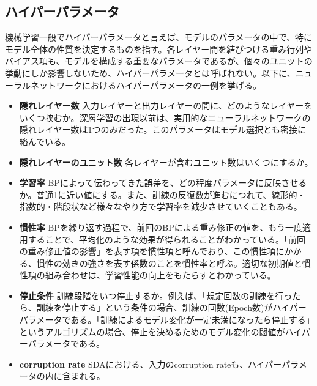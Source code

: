 \subsection{ハイパーパラメータ}
機械学習一般でハイパーパラメータと言えば、モデルのパラメータの中で、特にモデル全体の性質を決定するものを指す。各レイヤー間を結びつける重み行列やバイアス項も、モデルを構成する重要なパラメータであるが、個々のユニットの挙動にしか影響しないため、ハイパーパラメータとは呼ばれない。以下に、ニューラルネットワークにおけるハイパーパラメータの一例を挙げる。
\begin{itemize}
\item \textbf{隠れレイヤー数} 入力レイヤーと出力レイヤーの間に、どのようなレイヤーをいくつ挟むか。深層学習の出現以前は、実用的なニューラルネットワークの隠れレイヤー数は1つのみだった。このパラメータはモデル選択とも密接に絡んでいる。
\item \textbf{隠れレイヤーのユニット数} 各レイヤーが含むユニット数はいくつにするか。
\item \textbf{学習率} BPによって伝わってきた誤差を、どの程度パラメータに反映させるか。普通1に近い値にする。また、訓練の反復数が進むにつれて、線形的・指数的・階段状など様々なやり方で学習率を減少させていくこともある。
\item \textbf{慣性率} BPを繰り返す過程で、前回のBPによる重み修正の値を、もう一度適用することで、平均化のような効果が得られることがわかっている。「前回の重み修正値の影響」を表す項を慣性項と呼んでおり、この慣性項にかかる、慣性の効きの強さを表す係数のことを慣性率と呼ぶ。適切な初期値と慣性項の組み合わせは、学習性能の向上をもたらすとわかっている\cite{sutskever2013on-the-importance}。
\item \textbf{停止条件} 訓練段階をいつ停止するか。例えば、「規定回数の訓練を行ったら、訓練を停止する」という条件の場合、訓練の回数(Epoch数)がハイパーパラメータである。「訓練によるモデル変化が一定未満になったら停止する」というアルゴリズムの場合、停止を決めるためのモデル変化の閾値がハイパーパラメータである。
\item \textbf{corruption rate} SDAにおける、入力のcorruption rateも、ハイパーパラメータの内に含まれる。
\end{itemize}
